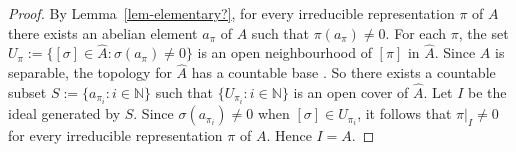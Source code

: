 \documentclass[12pt,a4paper]{amsart}
\newcommand{\field}[1]{\mathbb{#1}}
\newcommand{\NN}{\field{N}}
\begin{document}
\begin{proof}
By Lemma~\ref{lem-elementary?}, for every irreducible
representation $\pi$ of $A$ there exists an abelian element
$a_\pi$ of $A$ such that $\pi(a_\pi)\neq 0$.  For each $\pi$,
the set $U_\pi := \{[\sigma]\in\widehat A : \sigma(a_\pi) \ne 0
\}$
is an open neighbourhood of $[\pi]$ in
$\widehat A$. Since $A$ is separable, the topology for $\widehat A$ has
a countable base \cite[Proposition~3.3.4]{dix}. So there exists
a countable subset $S:=\{a_{\pi_i} : i \in \NN\}$ such that
$\{U_{\pi_i} : i \in \NN\}$ is an open cover of $\widehat A$. Let
$I$ be the ideal generated by $S$.  Since
$\sigma(a_{\pi_i})\neq 0$ when $[\sigma]\in U_{\pi_i}$, it
follows that  $\pi|_I\neq 0$ for every irreducible
representation $\pi$ of $A$. Hence $I=A$.
\end{proof}
\end{document}
